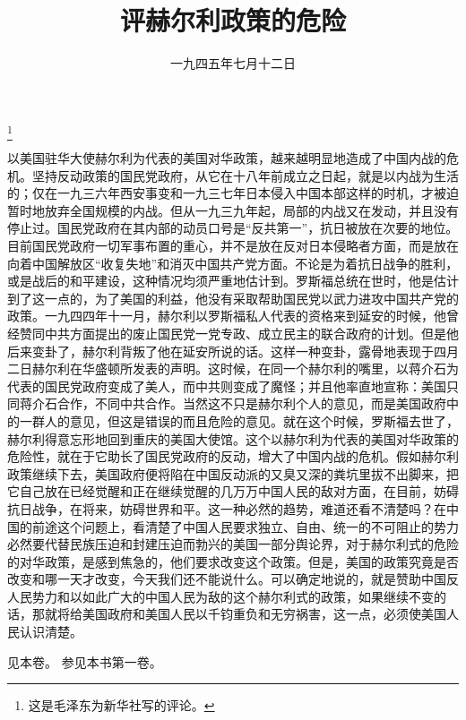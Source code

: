 
\title{评赫尔利政策的危险}
\date{一九四五年七月十二日}
\thanks{这是毛泽东为新华社写的评论。}
\maketitle


以美国驻华大使赫尔利为代表的美国对华政策，越来越明显地造成了中国内战的危机。坚持反动政策的国民党政府，从它在十八年前成立之日起，就是以内战为生活的；仅在一九三六年西安事变和一九三七年日本侵入中国本部这样的时机，才被迫暂时地放弃全国规模的内战。但从一九三九年起，局部的内战又在发动，并且没有停止过。国民党政府在其内部的动员口号是“反共第一”，抗日被放在次要的地位。目前国民党政府一切军事布置的重心，并不是放在反对日本侵略者方面，而是放在向着中国解放区“收复失地”和消灭中国共产党方面。不论是为着抗日战争的胜利，或是战后的和平建设，这种情况均须严重地估计到。罗斯福总统在世时，他是估计到了这一点的，为了美国的利益，他没有采取帮助国民党以武力进攻中国共产党的政策。一九四四年十一月，赫尔利以罗斯福私人代表的资格来到延安的时候，他曾经赞同中共方面提出的废止国民党一党专政、成立民主的联合政府的计划。但是他后来变卦了，赫尔利背叛了他在延安所说的话。这样一种变卦，露骨地表现于四月二日赫尔利在华盛顿所发表的声明。这时候，在同一个赫尔利的嘴里，以蒋介石为代表的国民党政府变成了美人，而中共则变成了魔怪；并且他率直地宣称：美国只同蒋介石合作，不同中共合作。当然这不只是赫尔利个人的意见，而是美国政府中的一群人的意见，但这是错误的而且危险的意见。就在这个时候，罗斯福去世了，赫尔利得意忘形地回到重庆的美国大使馆。这个以赫尔利为代表的美国对华政策的危险性，就在于它助长了国民党政府的反动，增大了中国内战的危机。假如赫尔利政策继续下去，美国政府便将陷在中国反动派的又臭又深的粪坑里拔不出脚来，把它自己放在已经觉醒和正在继续觉醒的几万万中国人民的敌对方面，在目前，妨碍抗日战争，在将来，妨碍世界和平。这一种必然的趋势，难道还看不清楚吗？在中国的前途这个问题上，看清楚了中国人民要求独立、自由、统一的不可阻止的势力必然要代替民族压迫和封建压迫而勃兴的美国一部分舆论界，对于赫尔利式的危险的对华政策，是感到焦急的，他们要求改变这个政策。但是，美国的政策究竟是否改变和哪一天才改变，今天我们还不能说什么。可以确定地说的，就是赞助中国反人民势力和以如此广大的中国人民为敌的这个赫尔利式的政策，如果继续不变的话，那就将给美国政府和美国人民以千钧重负和无穷祸害，这一点，必须使美国人民认识清楚。


\begin{maonote}
见本卷。
参见本书第一卷。
\end{maonote}
